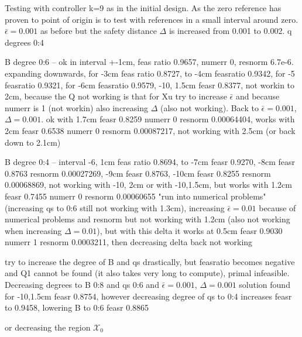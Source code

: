 Testing with controller k=9 as in the initial design. As the zero reference has proven to point of origin is to test with references in a small interval around zero. $\bar{\epsilon}=0.001$ as before but the safety distance $\Delta$ is increased from 0.001 to 0.002. q degrees 0:4

B degree 0:6 -- ok in interval +-1cm, feas ratio 0.9657, numerr 0, resnorm 6.7e-6. expanding downwards, for -3cm feas ratio 0.8727, to -4cm feasratio 0.9342, for -5 feasratio 0.9321, for -6cm feasratio 0.9579, -10, 1.5cm feasr 0.8377, not workin to 2cm, because the Q not working is that for Xu try to increase $\bar{\epsilon}$ and because numerr is 1 (not workin) also increasing $\Delta$ (also not working). Back to $\bar{\epsilon}=0.001$, $\Delta=0.001$. ok with 1.7cm feasr 0.8259 numerr 0 resnorm 0.00064404, works with 2cm feasr 0.6538 numerr 0 resnorm 0.00087217, not working with 2.5cm (or back down to 2.1cm)


B degree 0:4 -- interval -6, 1cm feas ratio 0.8694, to -7cm feasr 0.9270, -8cm feasr 0.8763 resnorm 0.00027269, -9cm feasr 0.8763, -10cm feasr 0.8255 resnorm 0.00068869, not working with -10, 2cm or with -10,1.5cm, but works with 1.2cm feasr 0.7455 numerr 0 resnorm 0.00060655 "run into numerical problems" (increasing qs to 0:6 still not working with 1.3cm), increasing $\bar{\epsilon}=0.01$ because of numerical problems and resnorm but not working with 1.2cm (also not working when increasing $\Delta=0.01$), but with this delta it works at 0.5cm feasr 0.9030 numerr 1 resnorm 0.0003211, then decreasing delta back not working

try to increase the degree of B and qs drastically, but feasratio becomes negative and Q1 cannot be found (it also takes very long to compute), primal infeasible. Decreasing degrees to B 0:8 and qs 0:6 and $\bar{\epsilon}=0.001$, $\Delta=0.001$ solution found for -10,1.5cm feasr 0.8754, however decreasing degree of qs to 0:4 increases feasr to 0.9458, lowering B to 0:6 feasr 0.8865

or decreasing the region $\mathcal{X}_0$